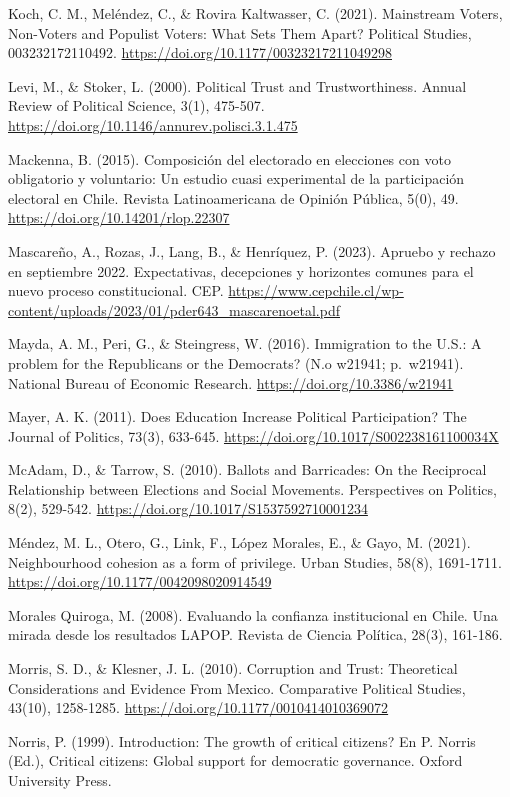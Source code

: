 \documentclass[
  12pt,
]{book}
\begin{document}
Koch, C. M., Meléndez, C., \& Rovira Kaltwasser, C. (2021). Mainstream Voters, Non-Voters and Populist Voters: What Sets Them Apart? Political Studies, 003232172110492. \url{https://doi.org/10.1177/00323217211049298}

Levi, M., \& Stoker, L. (2000). Political Trust and Trustworthiness. Annual Review of Political Science, 3(1), 475-507. \url{https://doi.org/10.1146/annurev.polisci.3.1.475}

Mackenna, B. (2015). Composición del electorado en elecciones con voto obligatorio y voluntario: Un estudio cuasi experimental de la participación electoral en Chile. Revista Latinoamericana de Opinión Pública, 5(0), 49. \url{https://doi.org/10.14201/rlop.22307}

Mascareño, A., Rozas, J., Lang, B., \& Henríquez, P. (2023). Apruebo y rechazo en septiembre 2022. Expectativas, decepciones y horizontes comunes para el nuevo proceso constitucional. CEP. \url{https://www.cepchile.cl/wp-content/uploads/2023/01/pder643_mascarenoetal.pdf}

Mayda, A. M., Peri, G., \& Steingress, W. (2016). Immigration to the U.S.: A problem for the Republicans or the Democrats? (N.o w21941; p.~w21941). National Bureau of Economic Research. \url{https://doi.org/10.3386/w21941}

Mayer, A. K. (2011). Does Education Increase Political Participation? The Journal of Politics, 73(3), 633-645. \url{https://doi.org/10.1017/S002238161100034X}

McAdam, D., \& Tarrow, S. (2010). Ballots and Barricades: On the Reciprocal Relationship between Elections and Social Movements. Perspectives on Politics, 8(2), 529-542. \url{https://doi.org/10.1017/S1537592710001234}

Méndez, M. L., Otero, G., Link, F., López Morales, E., \& Gayo, M. (2021). Neighbourhood cohesion as a form of privilege. Urban Studies, 58(8), 1691-1711. \url{https://doi.org/10.1177/0042098020914549}

Morales Quiroga, M. (2008). Evaluando la confianza institucional en Chile. Una mirada desde los resultados LAPOP. Revista de Ciencia Política, 28(3), 161-186.

Morris, S. D., \& Klesner, J. L. (2010). Corruption and Trust: Theoretical Considerations and Evidence From Mexico. Comparative Political Studies, 43(10), 1258-1285. \url{https://doi.org/10.1177/0010414010369072}

Norris, P. (1999). Introduction: The growth of critical citizens? En P. Norris (Ed.), Critical citizens: Global support for democratic governance. Oxford University Press.
\end{document}
